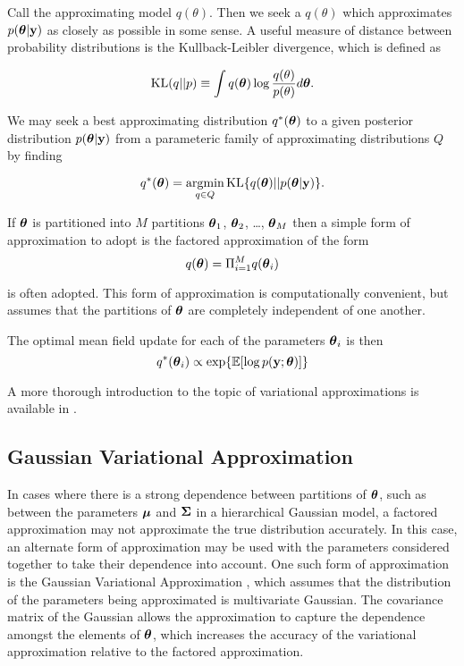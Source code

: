 \documentclass{amsart}[12pt]
\begin{document}
Call the approximating model $q(\theta)$. Then we seek a $q(\theta)$ which approximates $p({\boldsymbol \theta}|{\bf y})$
as closely as possible in some sense. A useful measure of distance between probability distributions is the
Kullback-Leibler divergence, which is defined as

$$
\text{KL}(q || p) \equiv \int q({\boldsymbol \theta}) \log{\frac{q(\theta)}{p(\theta)}} d {\boldsymbol \theta}.
$$

We may seek a best approximating distribution $q^*({\boldsymbol \theta})$ to a given posterior distribution
$p({\boldsymbol \theta}|{\bf y})$ from a parameteric family of approximating distributions $Q$ by finding

$$
q^*(\vtheta) = \argmin_{q \in Q} \KL \{ {q(\vtheta) || p(\vtheta|\vy)} \}.
$$

If ${\boldsymbol \theta}$ is partitioned into $M$ partitions ${\boldsymbol \theta}_1$, ${\boldsymbol \theta}_2$, \ldots, ${\boldsymbol \theta}_M$ then a 
simple form of approximation to adopt is the factored approximation of the form
\[
	q({\boldsymbol \theta}) = \Pi_{i=1}^M q({\boldsymbol \theta}_i)
\]

is often adopted. This form of approximation is computationally convenient, but assumes that the partitions
of ${\boldsymbol \theta}$ are completely independent of one another.

The optimal mean field update for each of the parameters ${\boldsymbol \theta}_i$ is then
\[
	q^*({\boldsymbol \theta}_i) \propto \exp \{ \mathbb{E} [\log p({\bf y}; {\boldsymbol \theta})] \}
\]

A more thorough introduction to the topic of variational approximations is available in \cite{Ormerod2010}.

\subsection{Gaussian Variational Approximation}

In cases where there is a strong dependence between partitions of ${\boldsymbol \theta}$, such as between the parameters
${\boldsymbol \mu}$ and ${\boldsymbol \Sigma}$ in a hierarchical Gaussian model, a factored approximation may not approximate the true
distribution accurately. In this case, an alternate form of approximation may be used with the parameters
considered together to take their dependence into account. One such form of approximation is the Gaussian
Variational Approximation \cite{Ormerod2012}, which assumes that the distribution of the parameters being 
approximated is multivariate Gaussian. The covariance matrix of the Gaussian allows the approximation to
capture the dependence amongst the elements of ${\boldsymbol \theta}$, which increases the accuracy of the variational
approximation relative to the factored approximation.
\end{document}
